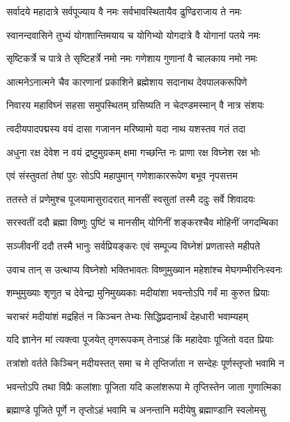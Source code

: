\twolineshloka
{सर्वादये महादात्रे सर्वपूज्याय वै नमः}
{सर्वभावस्थितायैव ढुण्ढिराजाय ते नमः} %

\twolineshloka
{स्वानन्दवासिने तुभ्यं योगशान्तिमयाय च}
{योगिभ्यो योगदात्रे वै योगानां पतये नमः} %

\twolineshloka
{सृष्टिकर्त्रे च पात्रे ते सृष्टिहर्त्रे नमो नमः}
{गणेशाय गुणानां वै चालकाय नमो नमः} %

\twolineshloka
{आत्मनेऽनात्मने चैव कारणानां प्रकाशिने}
{ब्रह्मेशाय सदानाथ देवपालकरूपिणे} %

\twolineshloka
{निवारय महाविघ्नं सहसा समुपस्थितम्}
{ग्रसिष्यति न चेदण्डमस्मान् वै नात्र संशयः} %

\twolineshloka
{त्वदीयपादपद्मस्य वयं दासा गजानन}
{मरिष्यामो यदा नाथ यशस्तव गतं तदा} %

\twolineshloka
{अधुना रक्ष देवेश न वयं द्रष्टुमुग्रकम्}
{क्षमा गच्छन्ति नः प्राणा रक्ष विघ्नेश रक्ष भोः} %

\twolineshloka
{एवं संस्तुवतां तेषां पुरः सोऽपि महापुमान्}
{गणेशाकाररूपेण बभूव नृपसत्तम} %

\twolineshloka
{ततस्ते तं प्रणेमुश्च पूजयामासुरादरात्}
{मानसीं स्वसुतां तस्मै ददुः सर्वे शिवादयः} %

\twolineshloka
{सरस्वतीं ददौ ब्रह्मा विष्णुः पुष्टिं च मानसीम्}
{योगिनीं शङ्करश्चैव मोहिनीं जगदम्बिका} %

\twolineshloka
{सञ्जीवनीं ददौ तस्मै भानुः सर्वप्रियङ्करः}
{एवं सम्पूज्य विघ्नेशं प्रणतास्ते महीपते} %

\twolineshloka
{उवाच तान् स उत्थाप्य विघ्नेशो भक्तिभावतः}
{विष्णुमुख्यान महेशांश्च मेघगम्भीरनिःस्वनः} %


\twolineshloka
{शम्भुमुख्याः श‍ृणुत च देवेन्द्रा मुनिमुख्यकाः}
{मदीयांशा भवन्तोऽपि गर्वं मा कुरुत प्रियाः} %

\twolineshloka
{चराचरं मदीयांशं मद्रहितं न किञ्चन}
{तेभ्यः सिद्धिप्रदानार्थं देहधारी भवाम्यहम्} %

\twolineshloka
{यदि ज्ञानेन मां त्यक्त्वा पूजयेत् तृणरूपकम्}
{तेनाऽहं किं महादेवाः पूजितो वदत प्रियाः} %

\twolineshloka
{तत्रांशो वर्तते किञ्चिन् मदीयस्तत् समा च मे}
{तृप्तिर्जाता न सन्देहः पूर्णस्तृप्तो भवामि न} %

\twolineshloka
{भवन्तोऽपि तथा विप्रैः कलांशाः पूजिता यदि}
{कलांशरूपा मे तृप्तिस्तेन जाता गुणात्मिका} %

\twolineshloka
{ब्रह्माण्डे पूजिते पूर्णे न तृप्तोऽहं भवामि च}
{अनन्तानि मदीयेषु ब्रह्माण्डानि स्वलोमसु} %

